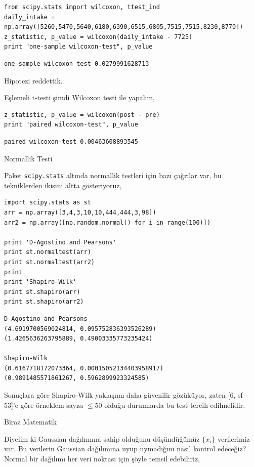 \documentclass[12pt,fleqn]{article}\usepackage{../../common}
\begin{document}
\begin{verbatim}
from scipy.stats import wilcoxon, ttest_ind
daily_intake = np.array([5260,5470,5640,6180,6390,6515,6805,7515,7515,8230,8770])
z_statistic, p_value = wilcoxon(daily_intake - 7725)
print "one-sample wilcoxon-test", p_value
\end{verbatim}

\begin{verbatim}
one-sample wilcoxon-test 0.0279991628713
\end{verbatim}

Hipotezi reddettik.

Eşlemeli t-testi şimdi Wilcoxon testi ile yapalım,

\begin{verbatim}
z_statistic, p_value = wilcoxon(post - pre)
print "paired wilcoxon-test", p_value
\end{verbatim}

\begin{verbatim}
paired wilcoxon-test 0.00463608893545
\end{verbatim}

Normallik Testi

Paket \verb!scipy.stats! altında normallik testleri için bazı çağrılar var,
bu tekniklerden ikisini altta gösteriyoruz,

\begin{verbatim}
import scipy.stats as st
arr = np.array([3,4,3,10,10,444,444,3,98])
arr2 = np.array([np.random.normal() for i in range(100)])

print 'D-Agostino and Pearsons'
print st.normaltest(arr)
print st.normaltest(arr2)
print
print 'Shapiro-Wilk'
print st.shapiro(arr)
print st.shapiro(arr2)
\end{verbatim}

\begin{verbatim}
D-Agostino and Pearsons
(4.6919700569024814, 0.095752836393526289)
(1.4265636263795889, 0.49003335773235424)

Shapiro-Wilk
(0.6167718172073364, 0.00015052134403958917)
(0.9891485571861267, 0.5962899923324585)
\end{verbatim}

Sonuçlara göre Shapiro-Wilk yaklaşımı daha güvenilir gözüküyor, zaten [6,
sf 53]'e göre örneklem sayısı $\le 50$ olduğu durumlarda bu test tercih
edilmelidir.

Biraz Matematik

Diyelim ki Gaussian dağılımına sahip olduğunu düşündüğümüz $\{ x_i\}$
verilerimiz var. Bu verilerin Gaussian dağılımına uyup uymadığını nasıl
kontrol edeceğiz? Normal bir dağılımı her veri noktası için şöyle temsil
edebiliriz,
\end{document}
